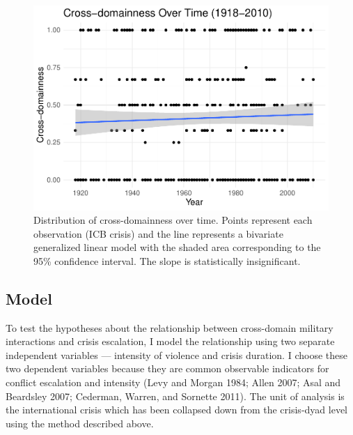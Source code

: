 \documentclass[
]{article}
\begin{document}
\begin{figure}[h!]

{\centering \includegraphics[width=0.8\linewidth,]{2021-03-26_ICB-Domains_files/figure-latex/cddness-time-1} 

}

\caption{Distribution of cross-domainness over time. Points represent each observation (ICB crisis) and the line represents a bivariate generalized linear model with the shaded area corresponding to the 95\% confidence interval. The slope is statistically insignificant.}\label{fig:cddness-time}
\end{figure}

\hypertarget{model}{%
\subsection{Model}\label{model}}

To test the hypotheses about the relationship between cross-domain military interactions and crisis escalation, I model the relationship using two separate independent variables --- intensity of violence and crisis duration. I choose these two dependent variables because they are common observable indicators for conflict escalation and intensity (Levy and Morgan 1984; Allen 2007; Asal and Beardsley 2007; Cederman, Warren, and Sornette 2011). The unit of analysis is the international crisis which has been collapsed down from the crisis-dyad level using the method described above.
\end{document}
